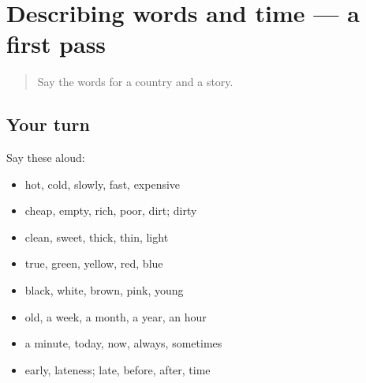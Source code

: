\section[(dialogue)]{Describing words and time — a first pass}

\label{lesson:MR-R120-first-pass-describing-words-and-time}



\begin{quote}
Say the words for a country and a story.
\end{quote}

\subsection*{Your turn}
Say these aloud:

\begin{itemize}
\raggedright
  \item hot, cold, slowly, fast, expensive
  \item cheap, empty, rich, poor, dirt; dirty
  \item clean, sweet, thick, thin, light
  \item true, green, yellow, red, blue
  \item black, white, brown, pink, young
  \item old, a week, a month, a year, an hour
  \item a minute, today, now, always, sometimes
  \item early, lateness; late, before, after, time
\end{itemize}

